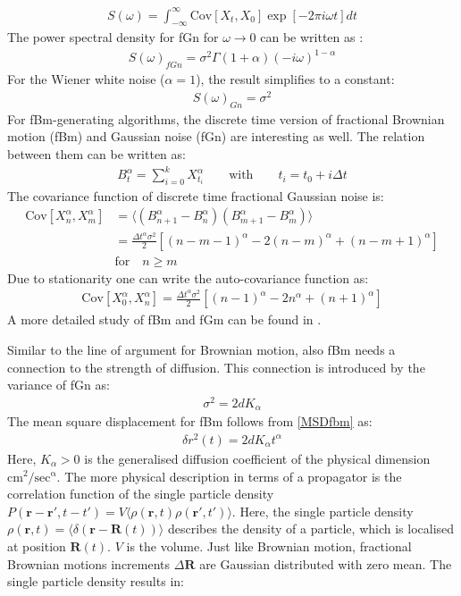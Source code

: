 \documentclass[
  a4paper,BCOR10mm,twoside,
  headsepline,footsepline,%
  fleqn,openbib
]{scrbook}
\begin{document}
\begin{align}
 S(\omega)= \int^{\infty}_{-\infty} \mathrm{Cov}[X_t,X_0] \exp[-2 \pi i \omega t] dt
\end{align}
The power spectral density for fGn for $\omega \longrightarrow 0$ can be written as \cite{Hofling2013}:
\begin{align}
 S(\omega)_{fGn}= \sigma^2 \Gamma(1+\alpha) (-i \omega)^{1-\alpha} \label{powerspec}
\end{align}
For the Wiener white noise ($\alpha=1$), the result simplifies to a constant:
\begin{align}
 S(\omega)_{Gn} = \sigma^2 
\end{align}
For fBm-generating algorithms, the discrete time version of fractional Brownian motion (fBm) and Gaussian noise (fGn) are interesting as well. The relation between them can be written as:
\begin{align}
B^{\alpha}_{t}= \sum_{i=0}^kX^{\alpha}_{t_i} \qquad \text{with} \qquad t_i= t_0+i \Delta t
\end{align}
The covariance function of discrete time fractional Gaussian noise is:
\begin{align}
 \mathrm{Cov}[X^{\alpha}_n,X^{\alpha}_m]&=\langle (B^{\alpha}_{n+1}-B^{\alpha}_n) (B^{\alpha}_{m+1}-B^{\alpha}_m)\rangle \nonumber \\ &=\frac{\Delta t^{\alpha} \sigma^2}{2}[(n-m-1)^{\alpha}-2(n-m)^{\alpha}+(n-m+1)^{\alpha}]\\ &  \text{for}  \quad n\geq m \nonumber
\end{align}
Due to stationarity one can write the auto-covariance function as:
\begin{align}
 \mathrm{Cov}[X^{\alpha}_0,X^{\alpha}_n]=\frac{\Delta t^{\alpha}\sigma^2}{2}[(n-1)^{\alpha}-2n^{\alpha}+(n+1)^{\alpha}] \label{autocovfgn}
\end{align}
A more detailed study of fBm and fGm can be found in \cite{qian2003fractional}.\par \bigskip Similar to the line of argument for Brownian motion, also fBm needs a connection to the strength of diffusion. This connection is introduced by the variance of fGn as: 
\begin{align}
\label{diffusionvariance}
\sigma^2=2dK_{\alpha} 
\end{align}
The mean square displacement for fBm follows from \cref{MSDfbm} as:
\begin{align}
\delta r^{2}(t)=2dK_{\alpha} t^{\alpha}
\end{align}
Here,  $K_{\alpha}>0$  is the generalised diffusion coefficient of the physical dimension $ \mathrm{cm^2/sec^{\alpha}} $. The more physical description in terms of a propagator is the correlation function of the single particle density $P(\bm{r}-\bm{r}',t-t')= V\langle\rho(\bm{r},t) \rho(\bm{r}',t')\rangle$. Here, the single particle density $\rho(\bm{r},t)=\langle \delta(\bm{r}-\bm{R}(t))\rangle$ describes the density of a particle, which is localised at position $\bm{R}(t)$. $V$ is the volume. Just like Brownian motion, fractional Brownian motions increments $\Delta \bm{R}$ are Gaussian distributed with zero mean. The single particle density results in:
\end{document}
